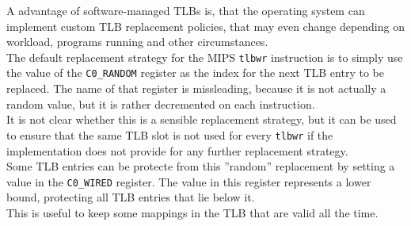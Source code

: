 






A advantage of software-managed TLBs is, that the operating system can implement custom
TLB replacement policies, that may even change depending on workload, programs running
and other circumstances.\\
The default replacement strategy for the MIPS \texttt{tlbwr} instruction is to simply
use the value of the \texttt{C0\_RANDOM} register as the index for the next TLB entry
to be replaced. The name of that register is missleading, because it is not actually a
random value, but it is rather decremented on each instruction\cite{heiserAnatomyHighPerformanceMicrokernel}.\\
It is not clear whether this is a sensible replacement strategy,
but it can be used to ensure that the same TLB slot is not used for every \texttt{tlbwr} if the implementation
does not provide for any further replacement strategy.\\
Some TLB entries can be protecte from this ''random'' replacement by setting a value in the \texttt{C0\_WIRED}
register. The value in this register represents a lower bound, protecting all TLB entries that lie below it.\\
This is useful to keep some mappings in the TLB that are valid all the time.

